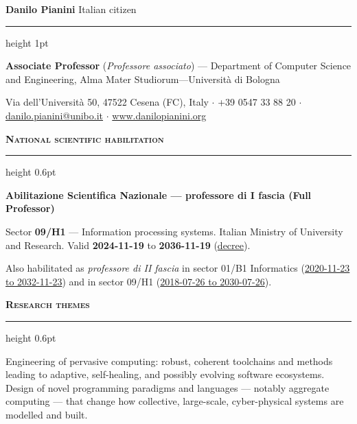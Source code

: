 \documentclass[a4paper,9pt]{extarticle}
\newcommand{\cvsection}[1]{%
  \par\vspace{3.5pt}%
  {\normalsize\bfseries\scshape #1}\par\vspace{1pt}%
  \hrule height 0.6pt\vspace{2.5pt}\par}
\begin{document}
{\LARGE\bfseries Danilo Pianini}\hfill
{\small Italian citizen}\par
\vspace{1pt}\hrule height 1pt\vspace{2.5pt}

\textbf{Associate Professor} (\emph{Professore associato}) ---
Department of Computer Science and Engineering, Alma Mater Studiorum---Universit\`a di Bologna\par
\vspace{1pt}
{\small
Via dell'Universit\`a 50, 47522 Cesena (FC), Italy \quad$\cdot$\quad
+39 0547 33 88 20 \quad$\cdot$\quad
\href{mailto:danilo.pianini@unibo.it}{danilo.pianini@unibo.it} \quad$\cdot$\quad
\href{http://www.danilopianini.org/}{www.danilopianini.org}\par}

\cvsection{National scientific habilitation}
\setlength{\fboxsep}{4pt}%
\noindent\colorbox{black!7}{%
\begin{minipage}{\dimexpr\textwidth-2\fboxsep\relax}
\textbf{\large Abilitazione Scientifica Nazionale --- professore di I fascia (Full Professor)}\par
\vspace{1pt}
Sector \textbf{09/H1} --- Information processing systems.
Italian Ministry of University and Research.
Valid \textbf{2024-11-19} to \textbf{2036-11-19}
(\href{https://asn23.cineca.it/pubblico/miur/esito-abilitato/09\%252FH1/1/2}{decree}).
\end{minipage}}\par
\vspace{2pt}
{\small Also habilitated as \emph{professore di II fascia} in sector 01/B1 Informatics
(\href{https://asn18.cineca.it/pubblico/miur/esito-abilitato/01\%252FB1/2/5}{2020-11-23 to 2032-11-23})
and in sector 09/H1
(\href{https://asn16.cineca.it/pubblico/miur/esito-abilitato/09\%252FH1/2/5}{2018-07-26 to 2030-07-26}).\par}

\cvsection{Research themes}
Engineering of pervasive computing: robust, coherent toolchains and methods leading to
adaptive, self-healing, and possibly evolving software ecosystems.
Design of novel programming paradigms and languages --- notably aggregate computing ---
that change how collective, large-scale, cyber-physical systems are modelled and built.
\end{document}
